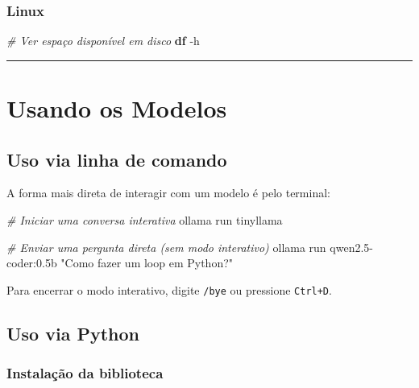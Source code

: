 \documentclass[
]{article}
\newenvironment{Shaded}{\begin{snugshade}}{\end{snugshade}}
\newcommand{\AttributeTok}[1]{\textcolor[rgb]{0.13,0.29,0.53}{#1}}
\newcommand{\CommentTok}[1]{\textcolor[rgb]{0.56,0.35,0.01}{\textit{#1}}}
\newcommand{\ExtensionTok}[1]{#1}
\newcommand{\FunctionTok}[1]{\textcolor[rgb]{0.13,0.29,0.53}{\textbf{#1}}}
\newcommand{\NormalTok}[1]{#1}
\newcommand{\StringTok}[1]{\textcolor[rgb]{0.31,0.60,0.02}{#1}}
\begin{document}
\subsubsection{Linux}\label{linux}

\begin{Shaded}
\begin{Highlighting}[]
\CommentTok{\# Ver espaço disponível em disco}
\FunctionTok{df} \AttributeTok{{-}h}
\end{Highlighting}
\end{Shaded}

\begin{center}\rule{0.5\linewidth}{0.5pt}\end{center}

\section{Usando os Modelos}\label{usando-os-modelos}

\subsection{Uso via linha de comando}\label{uso-via-linha-de-comando}

A forma mais direta de interagir com um modelo é pelo terminal:

\begin{Shaded}
\begin{Highlighting}[]
\CommentTok{\# Iniciar uma conversa interativa}
\ExtensionTok{ollama}\NormalTok{ run tinyllama}

\CommentTok{\# Enviar uma pergunta direta (sem modo interativo)}
\ExtensionTok{ollama}\NormalTok{ run qwen2.5{-}coder:0.5b }\StringTok{"Como fazer um loop em Python?"}
\end{Highlighting}
\end{Shaded}

Para encerrar o modo interativo, digite \texttt{/bye} ou pressione
\texttt{Ctrl+D}.

\subsection{Uso via Python}\label{uso-via-python}

\subsubsection{Instalação da
biblioteca}\label{instalauxe7uxe3o-da-biblioteca}
\end{document}
